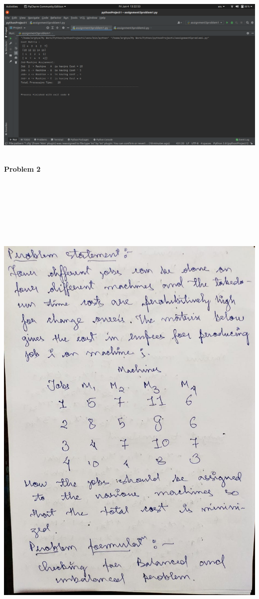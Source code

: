 \documentclass[12pt, letterpaper, twoside]{book}
\begin{document}
\includegraphics[width=550pt]{Output1}
\pagebreak

\begin{center}
\textbf{\\Problem 2}
\end{center}
\begin{flushleft}
\includegraphics[width=\paperwidth, height=10in]{Page7}
\end{flushleft}
\end{document}
